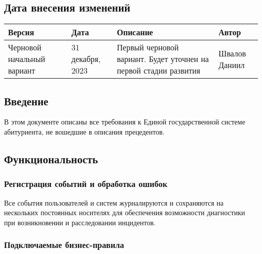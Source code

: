 \documentclass[a4paper, 14pt]{extarticle}
\begin{document}
\subsection*{Дата внесения изменений}

\begin{table}[H]
  \begin{tabular}{|L{0.17\textwidth}|L{0.19\textwidth}|L{0.4\textwidth}|L{0.15\textwidth}|}
    \hline
    \textbf{Версия}                                                  &
    \textbf{Дата}                                                    &
    \textbf{Описание}                                                &
    \textbf{Автор}                                                     \\
    \hline
    Черновой начальный вариант                                       &
    31 декабря, 2023                                                 &
    Первый черновой вариант. Будет уточнен на первой стадии развития &
    Швалов Даниил                                                      \\
    \hline
  \end{tabular}
\end{table}

\subsection*{Введение}

В этом документе описаны все требования к Единой государственной системе
абитуриента, не вошедшие в описания прецедентов.

\subsection*{Функциональность}

\subsubsection*{Регистрация событий и обработка ошибок}

Все события пользователей и систем журналируются и сохраняются на нескольких
постоянных носителях для обеспечения возможности диагностики при возникновении
и расследовании инцидентов.

\subsubsection*{Подключаемые бизнес-правила}
\end{document}
